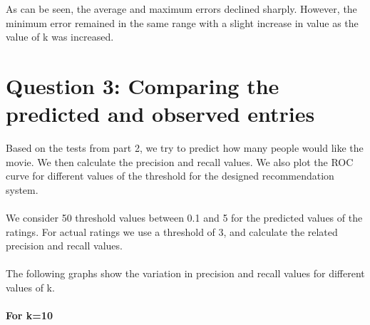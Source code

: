 \documentclass[12pt, onecolumn]{IEEEtran}
\begin{document}
As can be seen, the average and maximum errors declined sharply. However, the minimum error remained in the same range with a slight increase in value as the value of k was increased.
\vspace{0.5cm}
\section*{Question 3: Comparing the predicted and observed entries}
Based on the tests from part 2, we try to predict how many people would like the movie. We then calculate the precision and recall values. We also plot the ROC curve for different values of the threshold for the designed recommendation system.\\
\\
We consider 50 threshold values between 0.1 and 5 for the predicted values of the ratings. For actual ratings we use a threshold of 3, and calculate the related precision and recall values. \\
\\
The following graphs show the variation in precision and recall values for different values of k.\\
\\
\textbf{For k=10}
\end{document}
